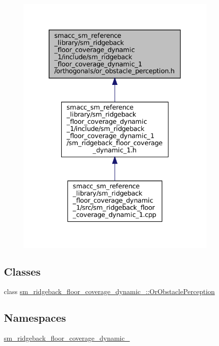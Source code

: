 \begin{figure}[H]
\begin{center}
\leavevmode
\includegraphics[width=283pt]{sm__ridgeback__floor__coverage__dynamic__1_2include_2sm__ridgeback__floor__coverage__dynamic__1_be97904ac9a470f5618b16c40f2e4eb3}
\end{center}
\end{figure}
\subsection*{Classes}
\begin{DoxyCompactItemize}
\item 
class \hyperlink{classsm__ridgeback__floor__coverage__dynamic__1_1_1OrObstaclePerception}{sm\+\_\+ridgeback\+\_\+floor\+\_\+coverage\+\_\+dynamic\+\_\+::\+Or\+Obstacle\+Perception}
\end{DoxyCompactItemize}
\subsection*{Namespaces}
\begin{DoxyCompactItemize}
\item 
 \hyperlink{namespacesm__ridgeback__floor__coverage__dynamic__1}{sm\+\_\+ridgeback\+\_\+floor\+\_\+coverage\+\_\+dynamic\+\_}
\end{DoxyCompactItemize}

